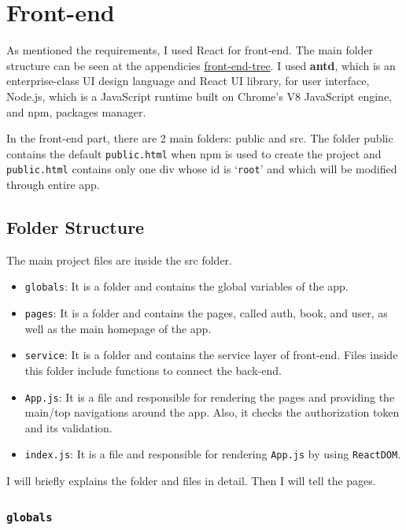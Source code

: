 \newpage
\section{Front-end}

As mentioned the requirements, I used React for front-end. The main folder structure can be seen at the appendicies \hyperref[front-end-tree]{front-end-tree}. I used \textbf{antd}, which is an enterprise-class UI design language and React UI library, for user interface, Node.js, which is a JavaScript runtime built on Chrome's V8 JavaScript engine, and npm, packages manager.

In the front-end part, there are 2 main folders: public and src. The folder public contains the default \texttt{public.html} when npm is used to create the project and \texttt{public.html} contains only one div whose id is `\texttt{root}' and which will be modified through entire app. 

\subsection{Folder Structure}

The main project files are inside the src folder.
\begin{itemize}
  \item \texttt{globals}: It is a folder and contains the global variables of the app.
  \item \texttt{pages}: It is a folder and contains the pages, called auth, book, and user, as well as the main homepage of the app.
  \item \texttt{service}: It is a folder and contains the service layer of front-end. Files inside this folder include functions to connect the back-end.
  \item \texttt{App.js}: It is a file and responsible for rendering the pages and providing the main/top navigations around the app. Also, it checks the authorization token and its validation.
  \item \texttt{index.js}: It is a file and responsible for rendering \texttt{App.js} by using \texttt{ReactDOM}.
\end{itemize}

I will briefly explains the folder and files in detail. Then I will tell the pages.

\subsubsection{\texttt{globals}}

